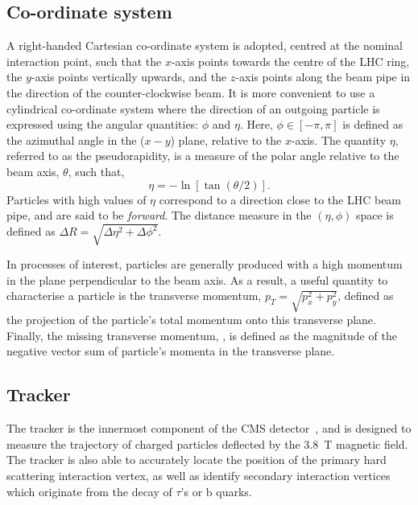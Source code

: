 \subsection{Co-ordinate system}
A right-handed Cartesian co-ordinate system is adopted, centred at the nominal interaction point, such that the $x$-axis points towards the centre of the LHC ring, the $y$-axis points vertically upwards, and the $z$-axis points along the beam pipe in the direction of the counter-clockwise beam. It is more convenient to use a cylindrical co-ordinate system where the direction of an outgoing particle is expressed using the angular quantities: $\phi$ and $\eta$. Here, $\phi \in [-\pi,\pi]$ is defined as the azimuthal angle in the ($x-y$) plane, relative to the $x$-axis. The quantity $\eta$, referred to as the pseudorapidity, is a measure of the polar angle relative to the beam axis, $\theta$, such that,
\begin{equation}
    \eta = - \ln[\tan(\theta/2)].
\end{equation}
Particles with high values of $\eta$ correspond to a direction close to the LHC beam pipe, and are said to be \textit{forward}. The distance measure in the $(\eta,\phi)$ space is defined as $\Delta R = \sqrt{\Delta\eta^2+\Delta\phi^2}$. 

In processes of interest, particles are generally produced with a high momentum in the plane perpendicular to the beam axis. As a result, a useful quantity to characterise a particle is the transverse momentum, $p_T = \sqrt{p_x^2+p_y^2}$, defined as the projection of the particle's total momentum onto this transverse plane. Finally, the missing transverse momentum, \met, is defined as the magnitude of the negative vector sum of particle's momenta in the transverse plane.

\subsection{Tracker}\label{sec:cms_tracker}
The tracker is the innermost component of the CMS detector~\cite{Chatrchyan:2008zzk,Chatrchyan:2014fea}, and is designed to measure the trajectory of charged particles deflected by the 3.8~T magnetic field. The tracker is also able to accurately locate the position of the primary hard scattering interaction vertex, as well as identify secondary interaction vertices which originate from the decay of $\tau$'s or b quarks. 

